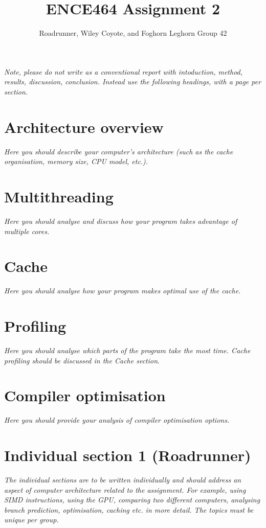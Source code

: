 \documentclass[a4paper,12pt]{article}
\title{ENCE464 Assignment 2}
\author{Roadrunner, Wiley Coyote, and Foghorn Leghorn Group 42}
\date{}
\newcommand{\comment}[1]{\emph{\color{blue}#1}}
\begin{document}
\maketitle

\comment{Note, please do not write as a conventional report with
  intoduction, method, results, discussion, conclusion.  Instead use
  the following headings, with a page per section.}


\section{Architecture overview}

\comment{Here you should describe your computer's architecture (such
  as the cache organisation, memory size, CPU model, etc.).}


\section{Multithreading}

\comment{Here you should analyse and discuss how your program takes
  advantage of multiple cores.}


\section{Cache}

\comment{Here you should analyse how your program makes optimal use
  of the cache.}


\section{Profiling}

\comment{Here you should analyse which parts of the program take the
  most time.  Cache profiling should be discussed in the Cache
  section}.


\section{Compiler optimisation}

\comment{Here you should provide your analysis of compiler
  optimisation options.}


\section{Individual section 1 (Roadrunner)}

\comment{The individual sections are to be written individually and
  should address an aspect of computer architecture related to the
  assignment.  For example, using SIMD instructions, using the GPU,
  comparing two different computers, analysing branch prediction,
  optimisation, caching etc. in more detail.  The topics must be
  unique per group.}
\end{document}
